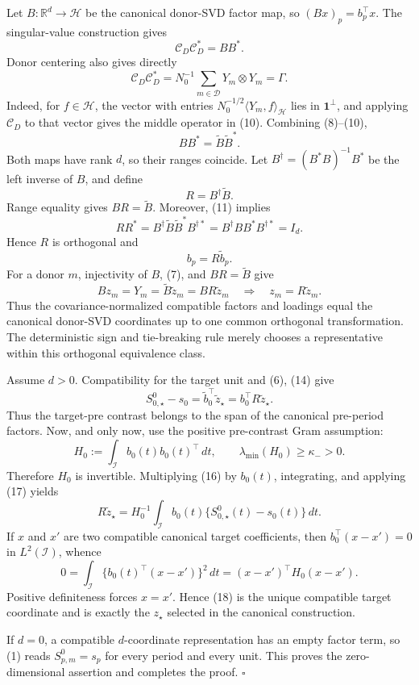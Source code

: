 Let \(B:\mathbb R^d\to\mathcal H\) be the canonical donor-SVD factor map,
so \((Bx)_p=b_p^\top x\).  The singular-value construction gives
\[
 \mathcal C_D\mathcal C_D^*=BB^*.                        \tag{9}
\]
Donor centering also gives directly
\[
 \mathcal C_D\mathcal C_D^*
 =N_0^{-1}\sum_{m\in\mathcal D}Y_m\otimes Y_m=\Gamma.   \tag{10}
\]
Indeed, for \(f\in\mathcal H\), the vector with entries
\(N_0^{-1/2}\langle Y_m,f\rangle_{\mathcal H}\) lies in
\(\mathbf 1^\perp\), and applying \(\mathcal C_D\) to that vector gives the
middle operator in (10).  Combining (8)--(10),
\[
 BB^*=\widetilde B\widetilde B^*.                        \tag{11}
\]
Both maps have rank \(d\), so their ranges coincide.  Let
\(B^\dagger=(B^*B)^{-1}B^*\) be the left inverse of \(B\), and define
\[
 R=B^\dagger\widetilde B.                                \tag{12}
\]
Range equality gives \(BR=\widetilde B\).  Moreover, (11) implies
\[
 RR^*=B^\dagger\widetilde B\widetilde B^*B^{\dagger *}
     =B^\dagger BB^*B^{\dagger *}=I_d.                  \tag{13}
\]
Hence \(R\) is orthogonal and
\[
 b_p=R\widetilde b_p.                                    \tag{14}
\]
For a donor \(m\), injectivity of \(B\), (7), and
\(BR=\widetilde B\) give
\[
 Bz_m=Y_m=\widetilde B\widetilde z_m=BR\widetilde z_m
 \quad\Longrightarrow\quad z_m=R\widetilde z_m.        \tag{15}
\]
Thus the covariance-normalized compatible factors and loadings equal the
canonical donor-SVD coordinates up to one common orthogonal transformation.
The deterministic sign and tie-breaking rule merely chooses a representative
within this orthogonal equivalence class.

Assume \(d>0\).  Compatibility for the target unit and (6), (14) give
\[
 S^0_{0,\star}-s_0
 =\widetilde b_0^\top\widetilde z_\star
 =b_0^\top R\widetilde z_\star.                          \tag{16}
\]
Thus the target-pre contrast belongs to the span of the canonical pre-period
factors.  Now, and only now, use the positive pre-contrast Gram assumption:
\[
 H_0:=\int_{\mathcal I}b_0(t)b_0(t)^\top\,dt,
 \qquad \lambda_{\min}(H_0)\geq\kappa_->0.              \tag{17}
\]
Therefore \(H_0\) is invertible.  Multiplying (16) by \(b_0(t)\),
integrating, and applying (17) yields
\[
 R\widetilde z_\star
 =H_0^{-1}\int_{\mathcal I}b_0(t)
 \{S^0_{0,\star}(t)-s_0(t)\}\,dt.                       \tag{18}
\]
If \(x\) and \(x'\) are two compatible canonical target coefficients, then
\(b_0^\top(x-x')=0\) in \(L^2(\mathcal I)\), whence
\[
 0=\int_{\mathcal I}\{b_0(t)^\top(x-x')\}^2\,dt
  =(x-x')^\top H_0(x-x').                                \tag{19}
\]
Positive definiteness forces \(x=x'\).  Hence (18) is the unique compatible
target coordinate and is exactly the \(z_\star\) selected in the canonical
construction.

If \(d=0\), a compatible \(d\)-coordinate representation has an empty factor
term, so (1) reads \(S^0_{p,m}=s_p\) for every period and every unit.  This
proves the zero-dimensional assertion and completes the proof. \(\square\)